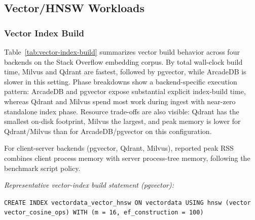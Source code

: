\documentclass[sigconf, nonacm]{acmart}
\begin{document}
\subsection{Vector/HNSW Workloads}

\subsubsection{Vector Index Build}

\begin{table}[tb]
  \centering
  \caption{Vector index build on Stack Overflow vectors (1,242,391 vectors, dim=384, HNSW m=16, ef\_construction/beam=100, mean over 3 runs).}
  \label{tab:vector-index-build}
  \small
\end{table}

Table~\ref{tab:vector-index-build} summarizes vector build behavior across four backends on the Stack Overflow embedding corpus. By total wall-clock build time, Milvus and Qdrant are fastest, followed by pgvector, while ArcadeDB is slower in this setting. Phase breakdowns show a backend-specific execution pattern: ArcadeDB and pgvector expose substantial explicit index-build time, whereas Qdrant and Milvus spend most work during ingest with near-zero standalone index phase. Resource trade-offs are also visible: Qdrant has the smallest on-disk footprint, Milvus the largest, and peak memory is lower for Qdrant/Milvus than for ArcadeDB/pgvector on this configuration.

For client-server backends (pgvector, Qdrant, Milvus), reported peak RSS combines client process memory with server process-tree memory, following the benchmark script policy.

\par\smallskip\noindent\hspace*{1em}\textit{Representative vector-index build statement (pgvector):}
\begin{flushleft}
\small
\texttt{CREATE INDEX vectordata\_vector\_hnsw}\
\texttt{ON vectordata USING hnsw (vector vector\_cosine\_ops)}\
\texttt{WITH (m = 16, ef\_construction = 100)}
\end{flushleft}
\end{document}
